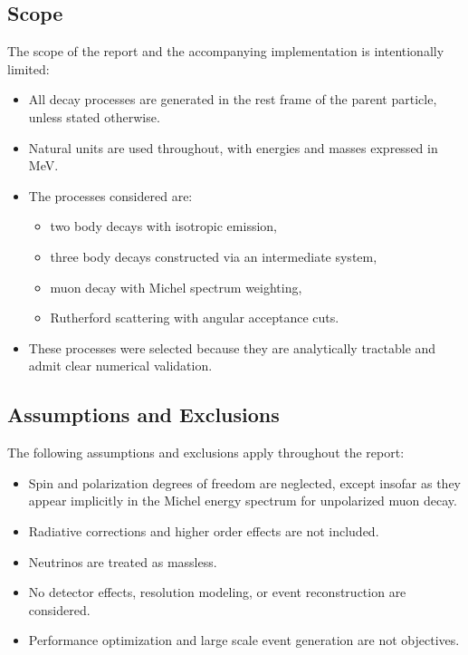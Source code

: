 \documentclass[11pt,a4paper]{article}
\begin{document}
\subsection*{Scope}

The scope of the report and the accompanying implementation is intentionally limited:
\begin{itemize}
  \item All decay processes are generated in the rest frame of the parent particle,
        unless stated otherwise.
  \item Natural units are used throughout, with energies and masses expressed in
        \si{MeV}.
  \item The processes considered are:
        \begin{itemize}
          \item two body decays with isotropic emission,
          \item three body decays constructed via an intermediate system,
          \item muon decay with Michel spectrum weighting,
          \item Rutherford scattering with angular acceptance cuts.
        \end{itemize}
  \item These processes were selected because they are analytically tractable and
        admit clear numerical validation.
\end{itemize}

\subsection*{Assumptions and Exclusions}

The following assumptions and exclusions apply throughout the report:
\begin{itemize}
  \item Spin and polarization degrees of freedom are neglected, except insofar as
        they appear implicitly in the Michel energy spectrum for unpolarized muon decay.
  \item Radiative corrections and higher order effects are not included.
  \item Neutrinos are treated as massless.
  \item No detector effects, resolution modeling, or event reconstruction are considered.
  \item Performance optimization and large scale event generation are not objectives.
\end{itemize}
\end{document}
